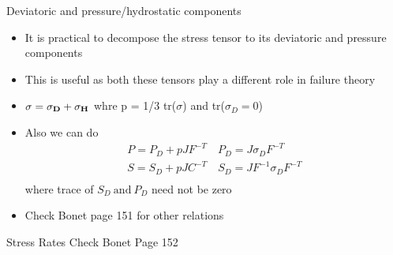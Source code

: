 	\begin{frame}{Deviatoric and pressure/hydrostatic components}
		\begin{itemize}
			\item It is practical to decompose the stress tensor to its deviatoric and pressure components
			\item This is useful as both these tensors play a different role in failure theory
			\item $\mathbf{\sigma = \sigma_D + \sigma_H }$
			whre p = 1/3 tr($\sigma$) and tr($\sigma_D = 0$)
			\item Also we can do 
			\begin{equation}
			\begin{aligned}
			P = P_D + pJF^{-T} \quad P_D =J \sigma_D F^{-T} \\ 
			S = S_D + pJC^{-T} \quad S_D =J F^{-1}\sigma_D F^{-T} \\ 
			\end{aligned}
			\end{equation}
			where trace of $S_D ~\text{and}~ P_D$ need not be zero
			\item Check Bonet page 151 for other relations
		\end{itemize}
	\end{frame}


	\begin{frame}{Stress Rates}
		Check Bonet Page 152
	\end{frame}